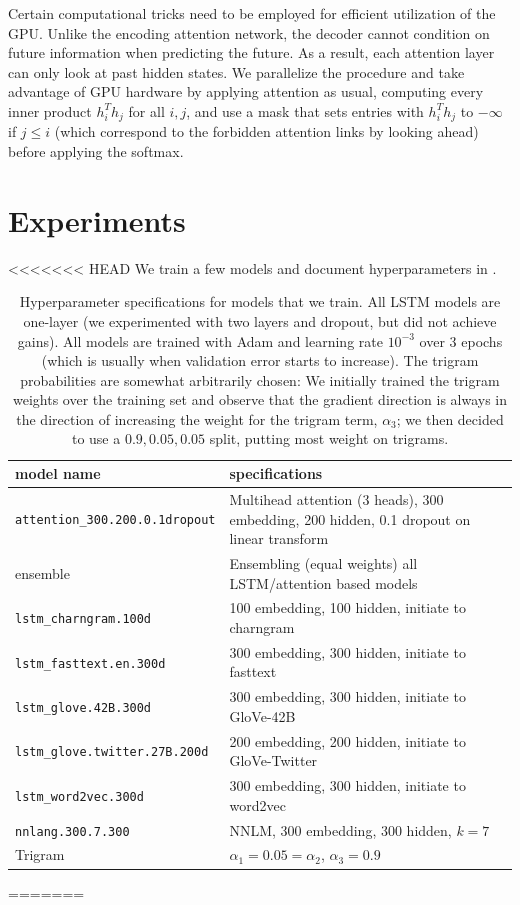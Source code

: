 \documentclass[12pt]{article}
\begin{document}
Certain computational tricks need to be employed for efficient utilization of
the GPU. Unlike the encoding attention network, the decoder cannot condition on
future information when predicting the future. As a result, each attention layer
can only look at past hidden states. We parallelize the procedure and take
advantage of GPU hardware by applying attention as usual, computing every
inner product $h_i^T h_j$ for all $i,j$, and use a mask that sets entries with
$h_i^T h_j$
to $-\infty$ if $j \le i$ (which correspond to the forbidden attention
links by looking ahead) before applying the softmax.

\section{Experiments}
<<<<<<< HEAD
We train a few models and document hyperparameters in . 
\begin{landscape}
\begin{table}[tb]
    
    \centering
\begin{tabular}{ll}
\toprule
model name                   &specifications\\
\midrule
\texttt{attention\_300.200.0.1dropout} & Multihead attention (3 heads), 300 embedding, 200 hidden, 0.1 dropout on linear transform\\
ensemble                     & Ensembling (equal weights) all LSTM/attention based models\\
\texttt{lstm\_charngram.100d }         & 100 embedding, 100 hidden, initiate to charngram \\
\texttt{lstm\_fasttext.en.300d }       & 300 embedding, 300 hidden, initiate to fasttext \\
\texttt{lstm\_glove.42B.300d    }      & 300 embedding, 300 hidden, initiate to GloVe-42B \\
\texttt{lstm\_glove.twitter.27B.200d}  & 200 embedding, 200 hidden, initiate to GloVe-Twitter \\
\texttt{lstm\_word2vec.300d         }  & 300 embedding, 300 hidden, initiate to word2vec \\
\texttt{nnlang.300.7.300            } & NNLM, 300 embedding, 300 hidden, $k=7$\\
Trigram & $\alpha_1 = 0.05 = \alpha_2$, $\alpha_3 = 0.9$\\
\bottomrule
\end{tabular}
    \caption{Hyperparameter specifications for models that we train. All LSTM
    models are one-layer (we experimented with two layers and dropout, but did
    not achieve gains). All models are trained with Adam and learning rate
    $10^{-3}$ over 3 epochs (which is usually when validation error starts to
    increase). The trigram probabilities are somewhat arbitrarily chosen: We
    initially trained the trigram weights over the training set and observe
    that the gradient direction is always in the direction of increasing the
    weight for the trigram term, $\alpha_3$; we then decided to use a $0.9,
    0.05,0.05$ split, putting most weight on trigrams.}
    \label{tab:spec}
\end{table}
\end{landscape}
=======
\end{document}
